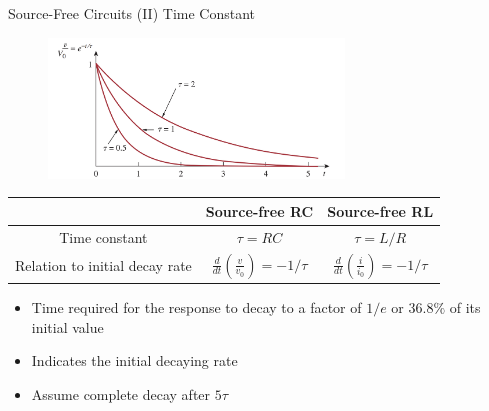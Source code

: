\documentclass{beamer}
\begin{document}
\begin{frame}{Source-Free Circuits (II) Time Constant}

\begin{figure}
    \centering
    \includegraphics[width=0.7\textwidth]{img_1order/3_plot_response.png}
\end{figure}

\begin{table}[]
    \centering
    \begin{small}
    \begin{tabular}{ccc}
        \toprule
        &Source-free RC & Source-free RL\\
        \midrule
        Time constant&$\tau = RC$&$\tau=L/R$\\
        Relation to initial decay rate&$\frac{d}{dt}(\frac{v}{v_0}) = -1/\tau$&$\frac{d}{dt}(\frac{i}{i_0}) = -1/\tau$\\
        \bottomrule
    \end{tabular}
    \end{small}
\end{table}
\begin{small}

\begin{itemize}
    \item Time required for the response to decay to a factor of $1/e$ or $36.8\%$ of its initial value
    \item Indicates the initial decaying rate
    \item Assume complete decay after $5\tau$
\end{itemize}
\end{small}


\end{frame}
\end{document}
